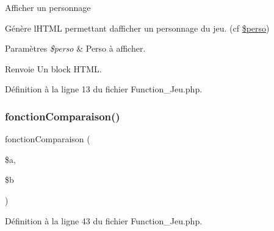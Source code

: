 Afficher un personnage

Génère l\textquotesingle{}H\+T\+ML permettant d\textquotesingle{}afficher un personnage du jeu. (cf \mbox{\hyperlink{sup__perso_8php_a648bcc9981df7cceb4b931a80064a6c5}{\$perso}}) 
\begin{DoxyParams}{Paramètres}
{\em \$perso} & Perso à afficher. \\
\hline
\end{DoxyParams}
\begin{DoxyReturn}{Renvoie}
Un block H\+T\+ML.
\end{DoxyReturn}


Définition à la ligne 13 du fichier Function\+\_\+\+Jeu.\+php.

\mbox{\label{_function___jeu_8php_a5a6fc05cddf49c4245e87a11976b09d4}} 
\subsubsection{\texorpdfstring{fonction\+Comparaison()}{fonctionComparaison()}}
{\footnotesize\ttfamily fonction\+Comparaison (\begin{DoxyParamCaption}\item[{}]{\$a,  }\item[{}]{\$b }\end{DoxyParamCaption})}



Définition à la ligne 43 du fichier Function\+\_\+\+Jeu.\+php.

